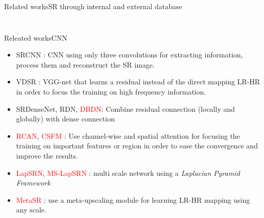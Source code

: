 \documentclass{beamer}
\begin{document}
\begin{frame}{Related works}{SR through internal and external database\cite[Releated works]{LapSRN}}
\begin{columns}
\begin{column}{0.5\textwidth}
\begin{figure}
\begin{subfigure}[l]{0.55\textwidth}
                \end{subfigure}
            \end{figure}
        \end{column}
    \end{columns}
\end{frame}

\begin{frame}{Releated works}{CNN \cite[Releated works]{ASDN} \cite{SRsurvey}}
    \begin{itemize}
        \item SRCNN \cite{srcnn} : CNN using only three convolutions for extracting information, process them and reconstruct the SR image.
        \item VDSR : VGG-net that learns a residual instead of the direct mapping LR-HR in order to focus the training on high frequency information.
        \item SRDenseNet, RDN, \textcolor{red}{DBDN\cite{DBDN}}: Combine residual connection (locally and globally) with dense connection
        \item \textcolor{red}{RCAN\cite{RCAN}}, \textcolor{red}{CSFM\cite{spatialattentionmechanism9}} : Use channel-wise and spatial attention for focusing the training on important features or region in order to ease the convergence and improve the results.
        \item \textcolor{red}{LapSRN\cite{LapSRN}}, \textcolor{red}{MS-LapSRN\cite{MSLapSRN}} : multi scale network using a \textit{Laplacian Pyramid Framework} \cite{laplacianpyramid}
        \item \textcolor{red}{MetaSR\cite{MetaSR}} : use a meta-upscaling module for learning LR-HR mapping using any scale.
    \end{itemize}
\end{frame}
\end{document}

